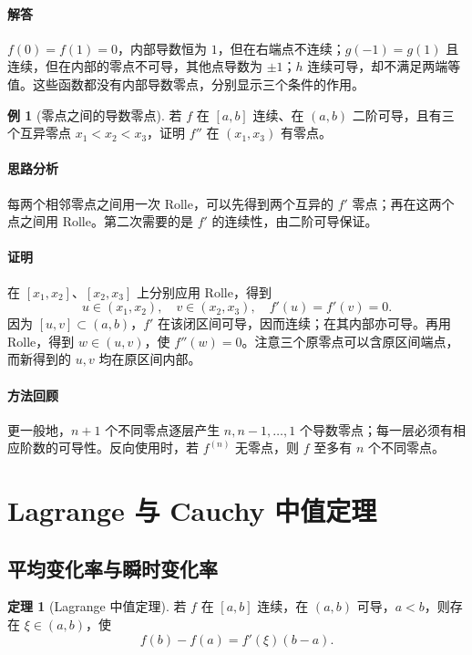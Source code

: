 \documentclass[UTF8,fontset=fandol,12pt,oneside,openany]{ctexrep}
\theoremstyle{definition}
\newtheorem{theorem}{定理}[chapter]
\newtheorem{example}{例}[chapter]
\begin{document}
\paragraph{解答}
$f(0)=f(1)=0$，内部导数恒为 $1$，但在右端点不连续；$g(-1)=g(1)$ 且连续，但在内部的零点不可导，其他点导数为 $\pm1$；$h$ 连续可导，却不满足两端等值。这些函数都没有内部导数零点，分别显示三个条件的作用。

\begin{example}[零点之间的导数零点]
若 $f$ 在 $[a,b]$ 连续、在 $(a,b)$ 二阶可导，且有三个互异零点 $x_1<x_2<x_3$，证明 $f''$ 在 $(x_1,x_3)$ 有零点。
\end{example}
\paragraph{思路分析}
每两个相邻零点之间用一次 Rolle，可以先得到两个互异的 $f'$ 零点；再在这两个点之间用 Rolle。第二次需要的是 $f'$ 的连续性，由二阶可导保证。
\paragraph{证明}
在 $[x_1,x_2]$、$[x_2,x_3]$ 上分别应用 Rolle，得到
\[
u\in(x_1,x_2),\quad v\in(x_2,x_3),\quad f'(u)=f'(v)=0.
\]
因为 $[u,v]\subset(a,b)$，$f'$ 在该闭区间可导，因而连续；在其内部亦可导。再用 Rolle，得到 $w\in(u,v)$，使 $f''(w)=0$。注意三个原零点可以含原区间端点，而新得到的 $u,v$ 均在原区间内部。
\paragraph{方法回顾}
更一般地，$n+1$ 个不同零点逐层产生 $n,n-1,\ldots,1$ 个导数零点；每一层必须有相应阶数的可导性。反向使用时，若 $f^{(n)}$ 无零点，则 $f$ 至多有 $n$ 个不同零点。

\section{Lagrange 与 Cauchy 中值定理}
\subsection{平均变化率与瞬时变化率}
\begin{theorem}[Lagrange 中值定理]\label{lec:06:lagrange}
若 $f$ 在 $[a,b]$ 连续，在 $(a,b)$ 可导，$a<b$，则存在 $\xi\in(a,b)$，使
\[
f(b)-f(a)=f'(\xi)(b-a).
\]
\end{theorem}
\end{document}
